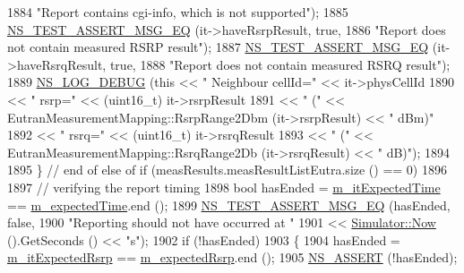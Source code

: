 \begin{DoxyCode}
1884                                  \textcolor{stringliteral}{"Report contains cgi-info, which is not supported"});
1885           \hyperlink{group__testing_ga2a9d78cffb3db8e867c35fff0b698cf5}{NS\_TEST\_ASSERT\_MSG\_EQ} (it->haveRsrpResult, \textcolor{keyword}{true},
1886                                  \textcolor{stringliteral}{"Report does not contain measured RSRP result"});
1887           \hyperlink{group__testing_ga2a9d78cffb3db8e867c35fff0b698cf5}{NS\_TEST\_ASSERT\_MSG\_EQ} (it->haveRsrqResult, \textcolor{keyword}{true},
1888                                  \textcolor{stringliteral}{"Report does not contain measured RSRQ result"});
1889           \hyperlink{group__logging_ga413f1886406d49f59a6a0a89b77b4d0a}{NS\_LOG\_DEBUG} (\textcolor{keyword}{this} << \textcolor{stringliteral}{" Neighbour cellId="} << it->physCellId
1890                              << \textcolor{stringliteral}{" rsrp="} << (uint16\_t) it->rsrpResult
1891                              << \textcolor{stringliteral}{" ("} << EutranMeasurementMapping::RsrpRange2Dbm (it->rsrpResult) << \textcolor{stringliteral}{" dBm)"}
1892                              << \textcolor{stringliteral}{" rsrq="} << (uint16\_t) it->rsrqResult
1893                              << \textcolor{stringliteral}{" ("} << EutranMeasurementMapping::RsrqRange2Db (it->rsrqResult) << \textcolor{stringliteral}{" dB)"});
1894 
1895         \} \textcolor{comment}{// end of else of if (measResults.measResultListEutra.size () == 0)}
1896 
1897       \textcolor{comment}{// verifying the report timing}
1898       \textcolor{keywordtype}{bool} hasEnded = \hyperlink{classLteUeMeasurementsHandoverTestCase_a95dfbfd7799a6d05744eb034fc490bb3}{m\_itExpectedTime} == \hyperlink{classLteUeMeasurementsHandoverTestCase_a3d9400d416e518e007955fff996b602d}{m\_expectedTime}.end ();
1899       \hyperlink{group__testing_ga2a9d78cffb3db8e867c35fff0b698cf5}{NS\_TEST\_ASSERT\_MSG\_EQ} (hasEnded, \textcolor{keyword}{false},
1900                              \textcolor{stringliteral}{"Reporting should not have occurred at "}
1901                              << \hyperlink{group__simulator_gac3635e2e87f7ce316c89290ee1b01d0d}{Simulator::Now} ().GetSeconds () << \textcolor{stringliteral}{"s"});
1902       \textcolor{keywordflow}{if} (!hasEnded)
1903         \{
1904           hasEnded = \hyperlink{classLteUeMeasurementsHandoverTestCase_a3536cc572e685490dd4e4fde364f39a3}{m\_itExpectedRsrp} == \hyperlink{classLteUeMeasurementsHandoverTestCase_ad5e8838ca7085c4c64b0483709da1332}{m\_expectedRsrp}.end ();
1905           \hyperlink{assert_8h_a6dccdb0de9b252f60088ce281c49d052}{NS\_ASSERT} (!hasEnded);

\end{DoxyCode}

